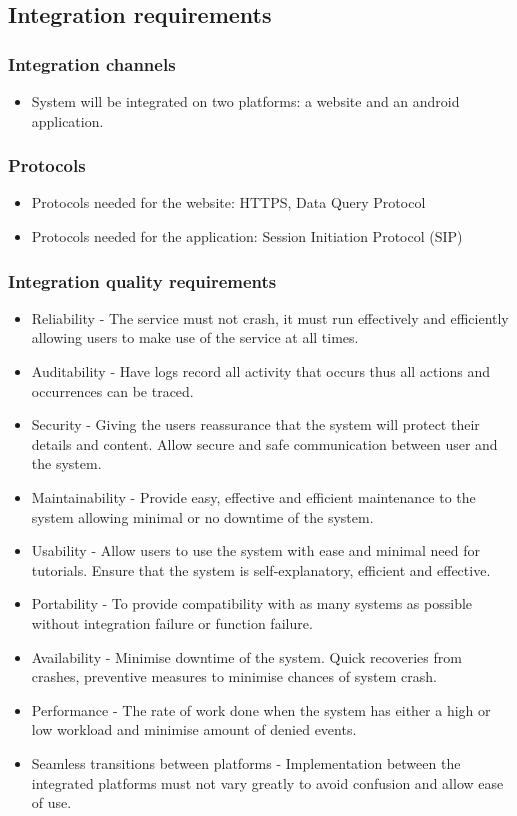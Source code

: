 \documentclass[11pt]{article}
\begin{document}
	\subsection{Integration requirements}
	
	\subsubsection{Integration channels}
	\begin{itemize}
		\item System will be integrated on two platforms: a website and an android application.
	\end{itemize}
	
	\subsubsection{Protocols}
	\begin{itemize}
		\item Protocols needed for the website:  HTTPS, Data Query Protocol
		\item Protocols needed for the application: Session Initiation Protocol (SIP)
	\end{itemize}
	
	\subsubsection{Integration quality requirements}
	\begin{itemize}
		\item Reliability - The service must not crash, it must run effectively and efficiently allowing users to make use of the service at all times.
		\item Auditability - Have logs record all activity that occurs thus all actions and occurrences can be traced.
		\item Security - Giving the users reassurance that the system will protect their details and content. Allow secure and safe communication between user and the system.
		\item Maintainability - Provide easy, effective and efficient maintenance to the system allowing minimal or no downtime of the system.
		\item Usability - Allow users to use the system with ease and minimal need for tutorials. Ensure that the system is self-explanatory, efficient and effective.
		\item Portability - To provide compatibility with as many systems as possible without integration failure or function failure.
		\item Availability - Minimise downtime of the system. Quick recoveries from crashes, preventive measures to minimise chances of system crash.
		\item Performance - The rate of work done when the system has either a high or low workload and minimise amount of denied events.
		\item Seamless transitions between platforms - Implementation between the integrated platforms must not vary greatly to avoid confusion and allow ease of use.
	\end{itemize}
	
\end{document}
